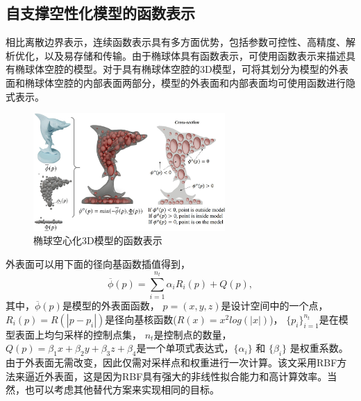 \subsection{自支撑空性化模型的函数表示}
相比离散边界表示，连续函数表示具有多方面优势，包括参数可控性、高精度、解析优化，以及易存储和传输。由于椭球体具有函数表示，可使用函数表示来描述具有椭球体空腔的模型。对于具有椭球体空腔的3D模型，可将其划分为模型的外表面和椭球体空腔的内部表面两部分，模型的外表面和内部表面均可使用函数进行隐式表示。
\begin{figure}[htbp]
  \begin {center}
  \includegraphics[width=0.65\textwidth]{./figures/self-support/fig4.png}
  \caption{椭球空心化3D模型的函数表示}
  \label{fig:3}
  \end {center}
\end{figure}

外表面可以用下面的径向基函数插值得到，
\begin{equation}
  \overline{\phi}(p)=\sum _{i=1}^{n_{t}}\alpha_{i}R_{i}(p)+Q(p),
  \label{eq:2}
\end{equation}
其中，$\overline{\phi}(p)$是模型的外表面函数，
$p=(x,y,z)$是设计空间中的一个点，
$R_{i}(p)=R(|p-p_{i}|)$是径向基核函数($R(x)=x^2log(|x|)$)，
$\{p_{i}\}^{n_{t}}_{i=1}$是在模型表面上均匀采样的控制点集，
$n_{t}$是控制点的数量，
$Q(p)=\beta_{1}x+\beta_{2}y+\beta_{3}z+\beta_{4}$是一个单项式表达式，$\{\alpha_{i}\}$ 和 $\{\beta_{i}\} $ 是权重系数。
由于外表面无需改变，因此仅需对采样点和权重进行一次计算。该文采用RBF方法来逼近外表面，这是因为RBF具有强大的非线性拟合能力和高计算效率。当然，也可以考虑其他替代方案来实现相同的目标。

